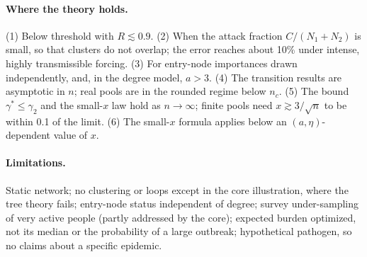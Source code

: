\documentclass[11pt,a4paper]{article}
\theoremstyle{definition}
\theoremstyle{remark}
\begin{document}
\paragraph{Where the theory holds.} (1) Below threshold with $R\lesssim0.9$. (2) When the
attack fraction $C/(N_1+N_2)$ is small, so that clusters do not overlap; the
error reaches about 10\% under intense, highly transmissible forcing. (3) For
entry-node importances drawn independently, and, in the degree model, $a>3$.
(4) The transition results are asymptotic in $n$; real pools are in the
rounded regime below $n_c$. (5) The bound $\gamma^*\le\gamma_2$ and the small-$x$ law hold as
$n\to\infty$; finite pools need $x\gtrsim3/\sqrt n$ to be within 0.1 of the limit. (6) The
small-$x$ formula applies below an $(a,\eta)$-dependent value of $x$.

\paragraph{Limitations.} Static network; no clustering or loops except in the
core illustration, where the tree theory fails; entry-node status independent
of degree; survey under-sampling of very active people (partly addressed by
the core); expected burden optimized, not its median or the probability of a
large outbreak; hypothetical pathogen, so no claims about a specific epidemic.





\end{document}
